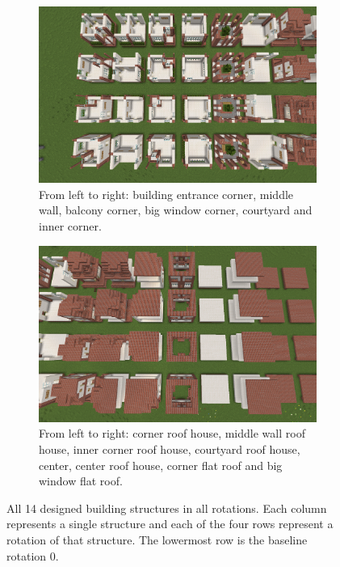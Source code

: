 \documentclass[
oneside,
fontsize=11pt
]{scrartcl}
\begin{document}
\begin{figure}[ht]
  \centering
  \begin{subfigure}[t]{0.48\textwidth}
    \includegraphics[width=\textwidth]{images/structures/buidling-structures-rotations-1.png}
    \caption{From left to right: building entrance corner, middle wall,
              balcony corner, big window corner, courtyard and inner corner.}
  \end{subfigure}
  \hfill
  \begin{subfigure}[t]{0.48\textwidth}
      \includegraphics[width=\textwidth]{images/structures/buidling-structures-rotations-2.png}
      \caption{From left to right: corner roof house, middle wall roof house, inner corner roof house,
              courtyard roof house, center, center roof house, corner flat roof and big window flat roof.}
  \end{subfigure}
  \caption{All 14 designed building structures in all rotations. 
    Each column represents a single structure and 
    each of the four rows represent a rotation of that structure.
    The lowermost row is the baseline rotation 0. }
  \label{fig_building_structures_rotations}
\end{figure}
\end{document}
